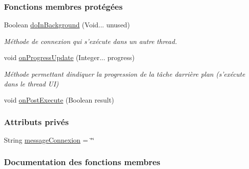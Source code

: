 \subsubsection*{Fonctions membres protégées}
\begin{DoxyCompactItemize}
\item 
Boolean \hyperlink{classfr_1_1campus_1_1laurainc_1_1honeybee_1_1_base_de_donnees_1_1_connexion_my_sql_a752c9f0f9a0879fceeeabd48c5fcb058}{do\+In\+Background} (Void... unused)
\begin{DoxyCompactList}\small\item\em Méthode de connexion qui s’exécute dans un autre thread. \end{DoxyCompactList}\item 
void \hyperlink{classfr_1_1campus_1_1laurainc_1_1honeybee_1_1_base_de_donnees_1_1_connexion_my_sql_ab9c34193cf45af727a5f5de4b27b1a46}{on\+Progress\+Update} (Integer... progress)
\begin{DoxyCompactList}\small\item\em Méthode permettant d\textquotesingle{}indiquer la progression de la tâche d\textquotesingle{}arrière plan (s’exécute dans le thread UI) \end{DoxyCompactList}\item 
void \hyperlink{classfr_1_1campus_1_1laurainc_1_1honeybee_1_1_base_de_donnees_1_1_connexion_my_sql_acea6398eed8fc31f2a847f1e4452046c}{on\+Post\+Execute} (Boolean result)
\end{DoxyCompactItemize}
\subsubsection*{Attributs privés}
\begin{DoxyCompactItemize}
\item 
String \hyperlink{classfr_1_1campus_1_1laurainc_1_1honeybee_1_1_base_de_donnees_1_1_connexion_my_sql_a8db83810efa310195fdd72bcbac2843f}{message\+Connexion} = \char`\"{}\char`\"{}
\end{DoxyCompactItemize}


\subsubsection{Documentation des fonctions membres}
\mbox{\label{classfr_1_1campus_1_1laurainc_1_1honeybee_1_1_base_de_donnees_1_1_connexion_my_sql_a752c9f0f9a0879fceeeabd48c5fcb058}} 
